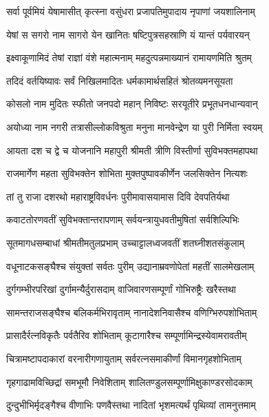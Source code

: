 
\twolineshloka
{सर्वा पूर्वमियं येषामासीत् कृत्स्ना वसुंधरा}
{प्रजापतिमुपादाय नृपाणां जयशालिनाम्} %

\twolineshloka
{येषां स सगरो नाम सागरो येन खानितः}
{षष्टिपुत्रसहस्राणि यं यान्तं पर्यवारयन्} %

\twolineshloka
{इक्ष्वाकूणामिदं तेषां राज्ञां वंशे महात्मनाम्}
{महदुत्पन्नमाख्यानं रामायणमिति श्रुतम्} %

\twolineshloka
{तदिदं वर्तयिष्यावः सर्वं निखिलमादितः}
{धर्मकामार्थसहितं श्रोतव्यमनसूयता} %

\twolineshloka
{कोसलो नाम मुदितः स्फीतो जनपदो महान्}
{निविष्टः सरयूतीरे प्रभूतधनधान्यवान्} %

\twolineshloka
{अयोध्या नाम नगरी तत्रासील्लोकविश्रुता}
{मनुना मानवेन्द्रेण या पुरी निर्मिता स्वयम्} %

\twolineshloka
{आयता दश च द्वे च योजनानि महापुरी}
{श्रीमती त्रीणि विस्तीर्णा सुविभक्तमहापथा} %

\twolineshloka
{राजमार्गेण महता सुविभक्तेन शोभिता}
{मुक्तपुष्पावकीर्णेन जलसिक्तेन नित्यशः} %

\twolineshloka
{तां तु राजा दशरथो महाराष्ट्रविवर्धनः}
{पुरीमावासयामास दिवि देवपतिर्यथा} %

\twolineshloka
{कवाटतोरणवतीं सुविभक्तान्तरापणाम्}
{सर्वयन्त्रायुधवतीमुषितां सर्वशिल्पिभिः} %

\twolineshloka
{सूतमागधसम्बाधां श्रीमतीमतुलप्रभाम्}
{उच्चाट्टालध्वजवतीं शतघ्नीशतसंकुलाम्} %

\twolineshloka
{वधूनाटकसङ्घैश्च संयुक्तां सर्वतः पुरीम्}
{उद्यानाम्रवणोपेतां महतीं सालमेखलाम्} %

\twolineshloka
{दुर्गगम्भीरपरिखां दुर्गामन्यैर्दुरासदाम्}
{वाजिवारणसम्पूर्णां गोभिरुष्ट्रैः खरैस्तथा} %

\twolineshloka
{सामन्तराजसङ्घैश्च बलिकर्मभिरावृताम्}
{नानादेशनिवासैश्च वणिग्भिरुपशोभिताम्} %

\twolineshloka
{प्रासादैर्रत्नविकृतैः पर्वतैरिव शोभिताम्}
{कूटागारैश्च सम्पूर्णामिन्द्रस्येवामरावतीम्} %

\twolineshloka
{चित्रामष्टापदाकारां वरनारीगणायुताम्}
{सर्वरत्नसमाकीर्णां विमानगृहशोभिताम्} %

\twolineshloka
{गृहगाढामविच्छिद्रां समभूमौ निवेशिताम्}
{शालितण्डुलसम्पूर्णामिक्षुकाण्डरसोदकाम्} %

\twolineshloka
{दुन्दुभीभिर्मृदङ्गैश्च वीणाभिः पणवैस्तथा}
{नादितां भृशमत्यर्थं पृथिव्यां तामनुत्तमाम्} %

